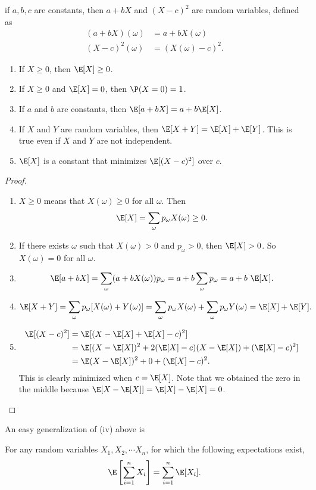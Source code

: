 \documentclass[a4paper]{article}
\begin{document}
\begin{eg}
  if $a, b, c$ are constants, then $a + bX$ and $(X - c)^2$ are random variables, defined as
  \begin{align*}
    (a + bX)(\omega) &= a + bX(\omega)\\
    (X - c)^2(\omega) &= (X(\omega) - c)^2.
  \end{align*}
\end{eg}

\begin{thm}\leavevmode
\begin{enumerate}
  \item If $X \geq 0$, then $\E[X] \geq 0$.
  \item If $X\geq 0$ and $\E[X] = 0$, then $\P(X = 0) = 1$.
  \item If $a$ and $b$ are constants, then $\E[a + bX] = a + b\E[X]$.
  \item If $X$ and $Y$ are random variables, then $\E[X + Y] = \E[X] + \E[Y]$. This is true even if $X$ and $Y$ are not independent.
  \item $\E[X]$ is a constant that minimizes $\E[(X - c)^2]$ over $c$.
\end{enumerate}
\end{thm}
\begin{proof}\leavevmode
  \begin{enumerate}
    \item $X \geq 0$ means that $X(\omega) \geq 0$ for all $\omega$. Then
      \[
        \E[X] = \sum_\omega p_\omega X(\omega) \geq 0.
      \]
    \item If there exists $\omega$ such that $X(\omega) > 0$ and $p_\omega > 0$, then $\E[X] > 0$. So $X(\omega) = 0$ for all $\omega$.
    \item
      \[
        \E[a + bX] = \sum_\omega (a + bX(\omega))p_\omega = a + b\sum_\omega p_\omega= a + b\ \E[X].
      \]
    \item
      \[ \E[X + Y] = \sum_\omega p_\omega[X(\omega) + Y(\omega)] = \sum_\omega p_\omega X(\omega) + \sum_\omega p_\omega Y(\omega) = \E[X] + \E[Y].
      \]
    \item
      \begin{align*}
        \E[(X - c)^2] &= \E[(X - \E[X] + \E[X] - c)^2]\\
        &= \E[(X - \E[X])^2 + 2(\E[X] - c)(X - \E[X]) + (\E[X] - c)^2]\\
        &= \E(X - \E[X])^2 + 0 + (\E[X] - c)^2.
      \end{align*}
      This is clearly minimized when $c = \E[X]$. Note that we obtained the zero in the middle because $\E[X - \E[X]] = \E[X] - \E[X] = 0$.\qedhere
  \end{enumerate}
\end{proof}
An easy generalization of (iv) above is
\begin{thm}
  For any random variables $X_1, X_2, \cdots X_n$, for which the following expectations exist,
  \[
    \E\left[\sum_{i = 1}^n X_i\right] = \sum_{i = 1}^n \E[X_i].
  \]
\end{thm}
\end{document}
